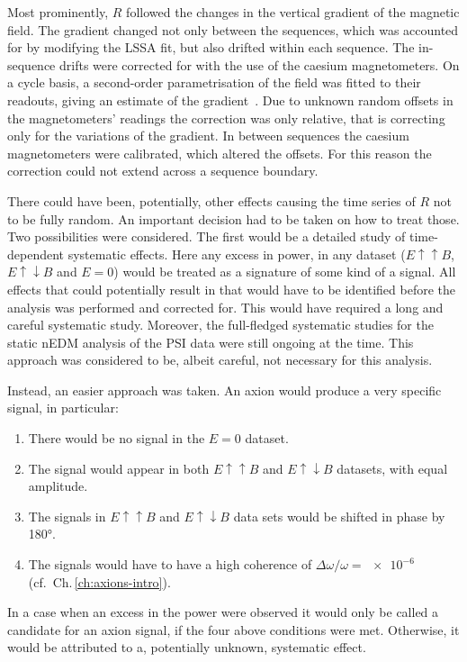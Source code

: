 Most prominently, $R$ followed the changes in the vertical gradient of the magnetic field.
The gradient changed not only between the sequences, which was accounted for by modifying the LSSA fit, but also drifted within each sequence.
The in-sequence drifts were corrected for with the use of the caesium magnetometers.
On a cycle basis, a second-order parametrisation of the field was fitted to their readouts, giving an estimate of the gradient~\cite{Afach2014magmoment,WurstenThesis}.
Due to unknown random offsets in the magnetometers' readings the correction was only relative, that is correcting only for the variations of the gradient.
In between sequences the caesium magnetometers were calibrated, which altered the offsets.
For this reason the correction could not extend across a sequence boundary.

There could have been, potentially, other effects causing the time series of $R$ not to be fully random.
An important decision had to be taken on how to treat those.
Two possibilities were considered.
The first would be a detailed study of time-dependent systematic effects.
Here any excess in power, in any dataset ($E \uparrow \uparrow B$, $E \uparrow \downarrow B$ and $E=0$) would be treated as a signature of some kind of a signal.
All effects that could potentially result in that would have to be identified before the analysis was performed and corrected for.
This would have required a long and careful systematic study.
Moreover, the full-fledged systematic studies for the static nEDM analysis of the PSI data were still ongoing at the time. This approach was considered to be, albeit careful, not necessary for this analysis.

Instead, an easier approach was taken. An axion would produce a very specific signal, in particular:
\begin{enumerate}
  \item There would be no signal in the $E=0$ dataset.
  \item The signal would appear in both $E \uparrow \uparrow B$ and $E \uparrow \downarrow B$ datasets, with equal amplitude.
  \item The signals in $E \uparrow \uparrow B$ and $E \uparrow \downarrow B$ data sets would be shifted in phase by \ang{180}.
  \item The signals would have to have a high coherence of $\Delta \omega / \omega = \num{e-6}$ (cf.\ Ch.\,\ref{ch:axions-intro}).
\end{enumerate}
In a case when an excess in the power were observed it would only be called a candidate for an axion signal, if the four above conditions were met.
Otherwise, it would be attributed to a, potentially unknown, systematic effect.

